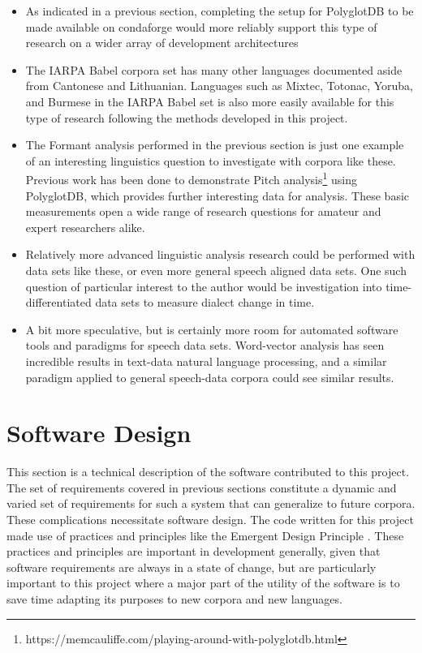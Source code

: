 \documentclass[11pt]{article}
\begin{document}
\begin{itemize}
  \item As indicated in a previous section, completing the setup for PolyglotDB to be made available on condaforge would more reliably support this type of research on a wider array of development architectures
  \item The IARPA Babel corpora set has many other languages documented aside from Cantonese and Lithuanian. Languages such as Mixtec, Totonac, Yoruba, and Burmese in the IARPA Babel set is also more easily available for this type of research following the methods developed in this project.
  \item The Formant analysis performed in the previous section is just one example of an interesting linguistics question to investigate with corpora like these. Previous work has been done to demonstrate Pitch analysis\footnote{https://memcauliffe.com/playing-around-with-polyglotdb.html} using PolyglotDB, which provides further interesting data for analysis. These basic measurements open a wide range of research questions for amateur and expert researchers alike.
  \item Relatively more advanced linguistic analysis research could be performed with data sets like these, or even more general speech aligned data sets. One such question of particular interest to the author would be investigation into time-differentiated data sets to measure dialect change in time.
  \item A bit more speculative, but is certainly more room for automated software tools and paradigms for speech data sets. Word-vector analysis has seen incredible results in text-data natural language processing, and a similar paradigm applied to general speech-data corpora could see similar results.
\end{itemize}

\section{Software Design}
This section is a technical description of the software contributed to this project. The set of requirements covered in previous sections constitute a dynamic and varied set of requirements for such a system that can generalize to future corpora. These complications necessitate software design. The code written for this project made use of practices and principles like the Emergent Design Principle \cite{bain_emergent_2008}. These practices and principles are important in development generally, given that software requirements are always in a state of change, but are particularly important to this project where a major part of the utility of the software is to save time adapting its purposes to new corpora and new languages. 
\end{document}
